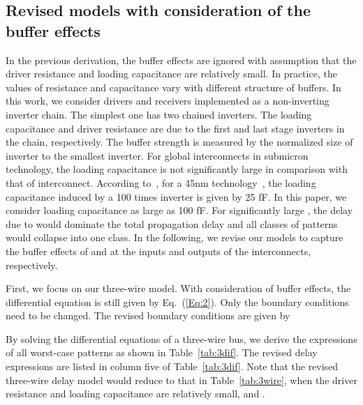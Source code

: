 \documentclass[10pt,journal]{IEEEtran}
\begin{document}
\subsection{Revised models with consideration of the buffer effects}
\label{sec:revised}
In the previous derivation, the buffer effects are ignored with assumption that the driver resistance and loading capacitance are relatively small. In practice, the values of resistance and capacitance vary with different structure of buffers.
In this work, we consider drivers and receivers implemented as a non-inverting inverter chain. The simplest one has two chained inverters. The loading capacitance  and driver resistance  are due to the first and last stage inverters in the chain, respectively.
The buffer strength is measured by the normalized size of inverter to the smallest inverter.
For global interconnects in submicron technology, the loading capacitance is not significantly large in comparison with that of interconnect. According to~\cite{ANRS_TCASI08}, for a 45nm technology~\cite{FreePDK45}, the loading capacitance  induced by a 100 times inverter is given by 25 fF. In this paper, we consider loading capacitance as large as 100 fF. For significantly large , the delay due to  would dominate the total propagation delay and all classes of patterns would collapse into one class.
In the following, we revise our models to capture the buffer effects of  and  at the inputs and outputs of the interconnects, respectively.




First, we focus on our three-wire model. With consideration of buffer effects, the differential equation is still given by Eq.~(\ref{Eq:2}). Only the boundary conditions need to be changed. The revised boundary conditions are given by



By solving the differential equations of a three-wire bus, we derive the expressions of all worst-case patterns as shown in Table~\ref{tab:3dif}.
The revised delay expressions are listed in column five of Table~\ref{tab:3dif}.
Note that the revised three-wire delay model would reduce to that in Table~\ref{tab:3wire}, when the driver resistance and loading capacitance are relatively small,  and .
\end{document}
